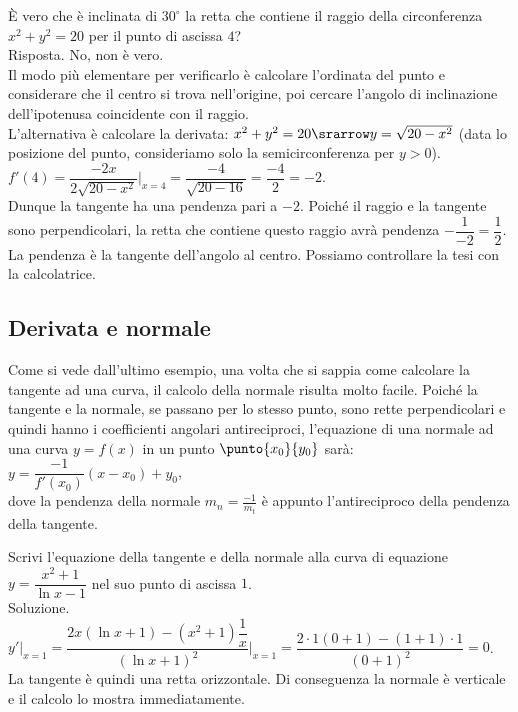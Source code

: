 \begin{esempio}
  È vero che è inclinata di $30^\circ$ la retta che contiene il raggio  
  della circonferenza $x^2+y^2=20$ per il punto di ascissa $4$?\\
  Risposta. No, non è vero. \\
  Il modo più elementare per verificarlo è calcolare l'ordinata
  del punto e considerare che il centro si trova nell'origine,
  poi cercare l'angolo di inclinazione dell'ipotenusa coincidente con il 
  raggio.\\
  L'alternativa è calcolare la derivata:
  $x^2+y^2=20\srarrow y=\sqrt{20-x^2}$ (data lo posizione del punto,
  consideriamo solo la semicirconferenza per $y>0$).\\
  $f'(4)= \dfrac{-2x}{2\sqrt{20-x^2}}\bigg|_{x=4}=\dfrac{-4}{\sqrt{20-16}}=
  \dfrac{-4}{2}=-2$.\\
  Dunque la tangente ha una pendenza pari a $-2$. Poiché il raggio e la 
  tangente sono perpendicolari, la retta che contiene questo raggio avrà 
  pendenza $-\dfrac{1}{-2}=\dfrac{1}{2}$.\\
  La pendenza è la tangente dell'angolo al centro. Possiamo controllare
  la tesi con la calcolatrice.
  \end{esempio}
 
\subsection{Derivata e normale}
\label{}
Come si vede dall'ultimo esempio, una volta che si sappia come calcolare 
la tangente ad una curva, il calcolo della normale risulta molto facile.
Poiché la tangente e la normale, se passano per lo stesso punto, sono rette
perpendicolari e quindi hanno i coefficienti angolari antireciproci,
l'equazione di una normale ad una curva $y=f(x)$ in un punto $\punto{x_0}{y_0}$
sarà:\\
$y=\dfrac{-1}{f'(x_0)}(x-x_0)+y_0$,\\
dove la pendenza della normale $m_n=\frac{-1}{m_t}$ è appunto l'antireciproco
della pendenza della tangente.

\begin{esempio}
Scrivi l'equazione della tangente e della normale alla curva di equazione
$y=\dfrac{x^2+1}{\ln x -1}$ nel suo punto di ascissa $1$.\\
Soluzione. $y'|_{x=1}=\dfrac{2x(\ln x+1)-(x^2+1)\dfrac{1}{x}}
{(\ln x +1)^2}\bigg|_{x=1}=\dfrac{2\cdot 1(0+1)-(1+1)\cdot 1}{(0+1)^2}=0$.\\
La tangente è quindi una retta orizzontale. Di conseguenza la normale è verticale
e il calcolo lo mostra immediatamente.
\end{esempio}

